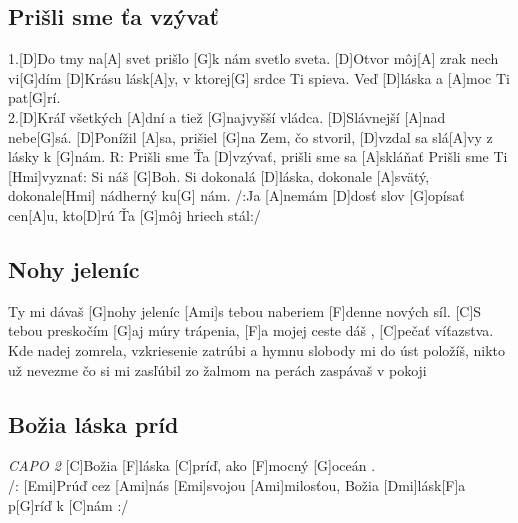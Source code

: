\documentclass[10pt]{article}
\begin{document}
\begin{Large}
\begin{minipage}{\textwidth}
\subsection{Prišli sme ťa vzývať}
\begin{multicols*}{2}
\begin{guitar}	
	1.[D]Do tmy na[A] svet 
	prišlo [G]k nám svetlo sveta.
	[D]Otvor môj[A] zrak nech vi[G]dím
	[D]Krásu lásk[A]y, v ktorej[G] srdce Ti spieva.
	Veď [D]láska a [A]moc Ti pat[G]rí.
	\\
	2.[D]Kráľ všetkých [A]dní 
	a tiež [G]najvyšší vládca.
	[D]Slávnejší [A]nad nebe[G]sá.
	[D]Ponížil [A]sa, prišiel [G]na Zem, čo stvoril,
	[D]vzdal sa slá[A]vy z lásky k [G]nám.
	\columnbreak
	R: Prišli sme Ťa [D]vzývať, 
	prišli sme sa [A]skláňať
	Prišli sme Ti [Hmi]vyznať: Si náš [G]Boh.
	Si dokonalá [D]láska, dokonale [A]svätý,
	dokonale[Hmi] nádherný ku[G] nám.
	/:Ja [A]nemám [D]dosť slov [G]opísať 
	cen[A]u, kto[D]rú Ťa [G]môj hriech stál:/
\end{guitar}
\end{multicols*}
\end{minipage}

\begin{minipage}{\textwidth}
\subsection{Nohy jeleníc}
\begin{multicols}{2}
\begin{guitar}	
	[C]Ty mi dávaš [G]nohy jeleníc
	[Ami]s tebou naberiem [F]denne nových síl.
	[C]S tebou preskočím [G]aj múry trápenia,
	[F]a mojej ceste dáš , [C]pečať víťazstva.
	\\
	Kde nadej zomrela, vzkriesenie zatrúbi
	a hymnu slobody mi do úst položíš,
	nikto už nevezme čo si mi zasľúbil
	zo žalmom na perách zaspávaš v pokoji
\end{guitar}
\end{multicols}
\end{minipage}

\begin{minipage}{\textwidth}
\subsection{Božia láska príd}
\begin{guitar}
	\textit{CAPO 2}
	[C]Božia [F]láska [C]príď, ako [F]mocný [G]oceán .
	\\
	/: [Emi]Prúď cez [Ami]nás [Emi]svojou [Ami]milosťou, 
	Božia [Dmi]lásk[F]a p[G]ríď k [C]nám :/
\end{guitar}
\end{minipage}


\end{Large}
\end{document}
